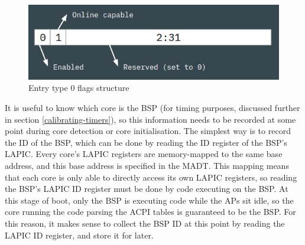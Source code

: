 \documentclass[bsc,frontabs,singlespacing,parskip,deptreport]{infthesis}
\begin{document}
\begin{figure}[h]
    \centering
    \includegraphics[scale=0.6]{figures/entry0flags.jpg}
    \caption{Entry type 0 flags structure}
    \label{entry0flags}
\end{figure}

It is useful to know which core is the BSP (for timing purposes, discussed further in section \ref{calibrating-timers}), so this information needs to be recorded at some point during core detection or core initialisation. The simplest way is to record the ID of the BSP, which can be done by reading the ID register of the BSP's LAPIC. Every core's LAPIC registers are memory-mapped to the same base address, and this base address is specified in the MADT. This mapping means that each core is only able to directly access its own LAPIC registers, so reading the BSP's LAPIC ID register must be done by code executing on the BSP. At this stage of boot, only the BSP is executing code while the APs sit idle, so the core running the code parsing the ACPI tables is guaranteed to be the BSP. For this reason, it makes sense to collect the BSP ID at this point by reading the LAPIC ID register, and store it for later.
\end{document}
